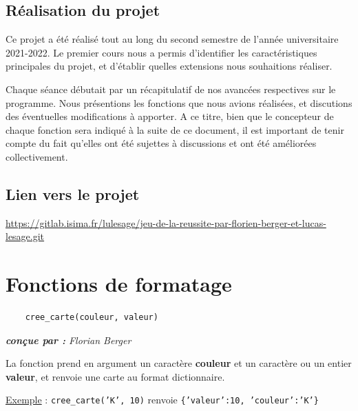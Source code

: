\documentclass[titlepage]{article}
\begin{document}
\subsection*{Réalisation du projet}

Ce projet a été réalisé tout au long du second semestre de l'année universitaire 2021-2022. Le premier cours nous a permis d'identifier les caractéristiques principales du projet, et d'établir quelles extensions nous souhaitions réaliser.\par
Chaque séance débutait par un récapitulatif de nos avancées respectives sur le programme. Nous présentions les fonctions que nous avions réalisées, et discutions des éventuelles modifications à apporter. A ce titre, bien que le concepteur de chaque fonction sera indiqué à la suite de ce document, il est important de tenir compte du fait qu'elles ont été sujettes à discussions et ont été améliorées collectivement.\par


\subsection*{Lien vers le projet}

\url{https://gitlab.isima.fr/lulesage/jeu-de-la-reussite-par-florien-berger-et-lucas-lesage.git}

\newpage
\section{Fonctions de formatage}
\label{sec : format}

\noindent	\begin{minipage}{\textwidth}
	\begin{lstlisting}
	cree_carte(couleur, valeur)	
	\end{lstlisting}
	\end{minipage}
	
\emph{\textbf{conçue par : } Florian Berger} \vspace{2mm}\par
La fonction prend en argument un caractère \textbf{couleur} et un caractère ou un entier \textbf{valeur}, et renvoie une carte au format dictionnaire.\vspace{1mm}\par
\underline{Exemple} : \texttt{cree\_carte('K', 10)} renvoie \texttt{\{'valeur':10, 'couleur':'K'\}}\par
\vspace{5mm}
\end{document}
